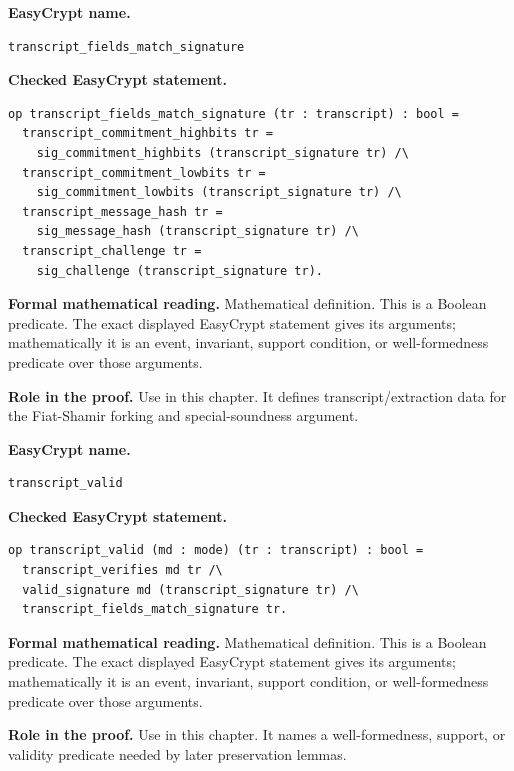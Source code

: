 \begin{formaldefinition}
\noindent\textbf{EasyCrypt name.}
\begin{lstlisting}[language=EasyCrypt,basicstyle=\ttfamily\scriptsize]
transcript_fields_match_signature
\end{lstlisting}
\noindent\textbf{Checked EasyCrypt statement.}
\begin{lstlisting}[language=EasyCrypt,basicstyle=\ttfamily\scriptsize]
op transcript_fields_match_signature (tr : transcript) : bool =
  transcript_commitment_highbits tr =
    sig_commitment_highbits (transcript_signature tr) /\
  transcript_commitment_lowbits tr =
    sig_commitment_lowbits (transcript_signature tr) /\
  transcript_message_hash tr =
    sig_message_hash (transcript_signature tr) /\
  transcript_challenge tr =
    sig_challenge (transcript_signature tr).
\end{lstlisting}
\noindent\textbf{Formal mathematical reading.}
Mathematical definition. This is a Boolean predicate.  The exact displayed EasyCrypt statement gives its arguments; mathematically it is an event, invariant, support condition, or well-formedness predicate over those arguments.

\noindent\textbf{Role in the proof.}
Use in this chapter. It defines transcript/extraction data for the Fiat-Shamir forking and special-soundness argument.

\end{formaldefinition}

\begin{formaldefinition}[EasyCrypt line 89]
\noindent\textbf{EasyCrypt name.}
\begin{lstlisting}[language=EasyCrypt,basicstyle=\ttfamily\scriptsize]
transcript_valid
\end{lstlisting}
\noindent\textbf{Checked EasyCrypt statement.}
\begin{lstlisting}[language=EasyCrypt,basicstyle=\ttfamily\scriptsize]
op transcript_valid (md : mode) (tr : transcript) : bool =
  transcript_verifies md tr /\
  valid_signature md (transcript_signature tr) /\
  transcript_fields_match_signature tr.
\end{lstlisting}
\noindent\textbf{Formal mathematical reading.}
Mathematical definition. This is a Boolean predicate.  The exact displayed EasyCrypt statement gives its arguments; mathematically it is an event, invariant, support condition, or well-formedness predicate over those arguments.

\noindent\textbf{Role in the proof.}
Use in this chapter. It names a well-formedness, support, or validity predicate needed by later preservation lemmas.

\end{formaldefinition}

